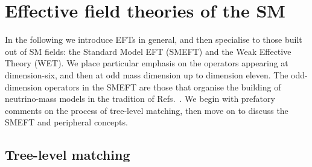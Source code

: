 \section{Effective field theories of the SM}

In the following we introduce EFTs in general, and then specialise to those
built out of SM fields: the Standard Model EFT (SMEFT) and the Weak Effective
Theory (WET). We place particular emphasis on the operators appearing at
dimension-six, and then at odd mass dimension up to dimension eleven. The
odd-dimension operators in the SMEFT are those that organise the building of
neutrino-mass models in the tradition of Refs.~\cite{Babu:2001ex,
  deGouvea:2007qla, PhysRevD.87.073007, Cai:2014kra}. We begin with prefatory
comments on the process of tree-level matching, then move on to discuss the
SMEFT and peripheral concepts.

\subsection{Tree-level matching}


